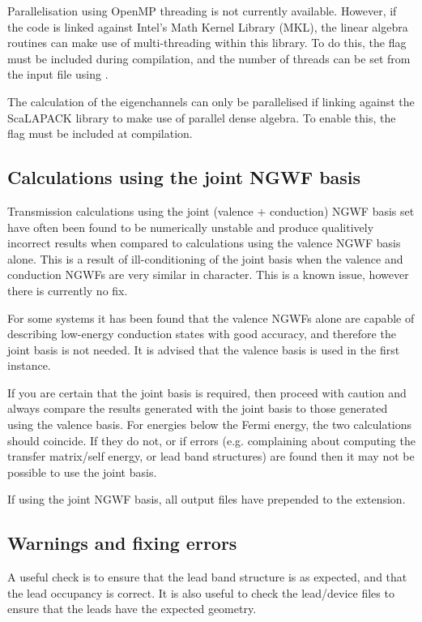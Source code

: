 \documentclass[letterpaper,10pt,english]{sphinxmanual}
\begin{document}
Parallelisation using OpenMP threading is not currently available.
However, if the code is linked against Intel’s Math Kernel Library
(MKL), the linear algebra routines can make use of multi-threading
within this library. To do this, the flag  must be included
during compilation, and the number of threads can be set from the input
file using .

The calculation of the eigenchannels can only be parallelised if linking
against the ScaLAPACK library to make use of parallel dense algebra. To
enable this, the flag  must be included at compilation.


\subsection{Calculations using the joint NGWF basis}
\label{\detokenize{transport:calculations-using-the-joint-ngwf-basis}}
Transmission calculations using the joint (valence + conduction) NGWF
basis set have often been found to be numerically unstable and produce
qualitively incorrect results when compared to calculations using the
valence NGWF basis alone. This is a result of ill-conditioning of the
joint basis when the valence and conduction NGWFs are very similar in
character. This is a known issue, however there is currently no fix.

For some systems it has been found that the valence NGWFs alone are
capable of describing low-energy conduction states with good accuracy,
and therefore the joint basis is not needed. It is advised that the
valence basis is used in the first instance.

If you are certain that the joint basis is required, then proceed with
caution and always compare the results generated with the joint basis to
those generated using the valence basis. For energies below the Fermi
energy, the two calculations should coincide. If they do not, or if
errors (e.g. complaining about computing the transfer matrix/self
energy, or lead band structures) are found then it may not be possible
to use the joint basis.

If using the joint NGWF basis, all output files have  prepended
to the extension.


\subsection{Warnings and fixing errors}
\label{\detokenize{transport:warnings-and-fixing-errors}}
A useful check is to ensure that the lead band structure is as expected,
and that the lead occupancy is correct. It is also useful to check the
lead/device  files to ensure that the leads have the expected
geometry.
\end{document}
